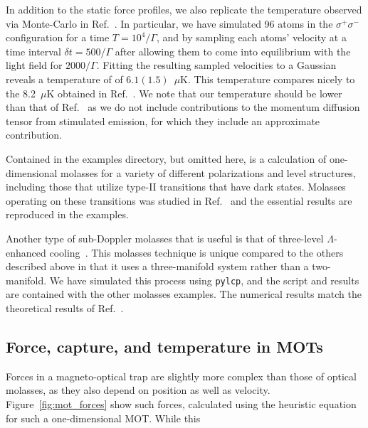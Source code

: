 \documentclass[final,5p,times,twocolumn]{elsarticle}
\begin{document}

In addition to the static force profiles, we also replicate the temperature observed via Monte-Carlo in Ref.~\cite{Ungar1989}.  In particular, we have simulated 96 atoms in the $\sigma^+\sigma^-$ configuration for a time $T=10^4/\Gamma$, and by sampling each atoms' velocity at a time interval $\delta t=500/\Gamma$ after allowing them to come into equilibrium with the light field for $2000/\Gamma$.  Fitting the resulting sampled velocities to a Gaussian reveals a temperature of  of $6.1(1.5)$~$\mu$K.  This temperature  compares nicely to the 8.2~$\mu$K obtained in Ref.~\cite{Ungar1989}.  We note that our temperature should be lower than that of Ref.~\cite{Ungar1989} as we do not include contributions to the momentum diffusion tensor from stimulated emission, for which they include an approximate contribution.

Contained in the examples directory, but omitted here, is a calculation of one-dimensional molasses for a variety of different polarizations and level structures, including those that utilize type-II transitions that have dark states.  Molasses operating on these transitions was studied in Ref.~\cite{Devlin2016} and the essential results are reproduced in the examples.

Another type of sub-Doppler molasses that is useful is that of three-level $\Lambda$-enhanced cooling~\cite{Grier2013}.  This molasses technique is unique compared to the others described above in that it uses a three-manifold system rather than a two-manifold.  We have simulated this process using {\tt pylcp}, and the script and results are contained with the other molasses examples.  The numerical results match the theoretical results of Ref.~\cite{Grier2013}.

\subsection{Force, capture, and temperature in MOTs}
Forces in a magneto-optical trap are slightly more complex than those of optical molasses, as they also depend on position as well as velocity.  Figure~\ref{fig:mot_forces} show such forces, calculated using the heuristic equation for such a one-dimensional MOT.  While this 
\end{document}
